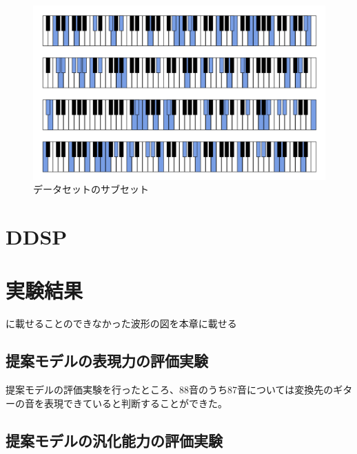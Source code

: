 \begin{figure}[h]
\centering
\includegraphics[width=\columnwidth]{figure/data_div.png}
\caption{データセットのサブセット}
\label{fig:data_div}
\end{figure}

\chapter{DDSP}
\label{app:DDSP}

\chapter{実験結果}
\label{app:result}

に載せることのできなかった波形の図を本章に載せる

\section{提案モデルの表現力の評価実験}

提案モデルの評価実験を行ったところ、88音のうち87音については変換先のギターの音を表現できていると判断することができた。


\section{提案モデルの汎化能力の評価実験}